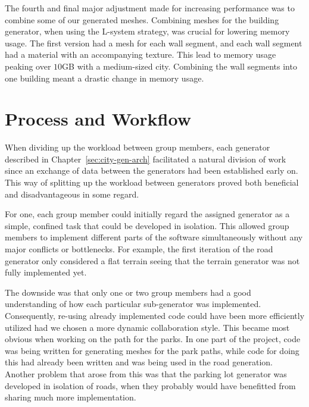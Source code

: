The fourth and final major adjustment made for increasing performance was to combine some of our generated meshes. 
Combining meshes for the building generator, when using the L-system strategy, was crucial for lowering memory usage. 
The first version had a mesh for each wall segment, and each wall segment had a material with an accompanying texture. 
This lead to memory usage peaking over $10$GB with a medium-sized city. 
Combining the wall segments into one building meant a drastic change in memory usage. 

\section{Process and Workflow}
When dividing up the workload between group members, each generator described in Chapter~\ref{sec:city-gen-arch} facilitated a natural division of work since an exchange of data between the generators had been established early on.
This way of splitting up the workload between generators proved both beneficial and disadvantageous in some regard.

For one, each group member could initially regard the assigned generator as a simple, confined task that could be developed in isolation.
This allowed group members to implement different parts of the software simultaneously without any major conflicts or bottlenecks.
For example, the first iteration of the road generator only considered a flat terrain seeing that the terrain generator was not fully implemented yet.

The downside was that only one or two group members had a good understanding of how each particular sub-generator was implemented.
Consequently, re-using already implemented code could have been more efficiently utilized had we chosen a more dynamic collaboration style.
This became most obvious when working on the path for the parks.
In one part of the project, code was being written for generating meshes for the park paths, while code for doing this had already been written and was being used in the road generation.
Another problem that arose from this was that the parking lot generator was developed in isolation of roads, when they probably would have benefitted from sharing much more implementation.

